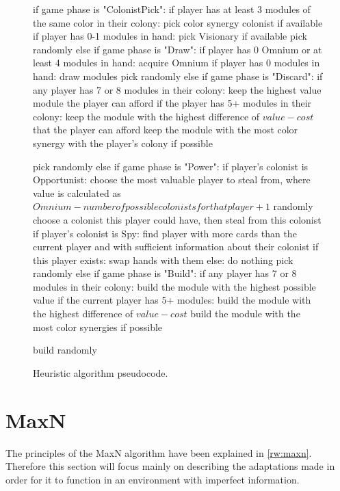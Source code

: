 \begin{figure}[h!]
\begin{code}[commandchars=\\\{\},codes={\catcode`\$=3\catcode`\^=7\catcode`\_=8}]
if game phase is "ColonistPick":
    if player has at least 3 modules of the same color in their colony:
        pick color synergy colonist if available
    if player has 0-1 modules in hand:
        pick Visionary if available
    pick randomly
else if game phase is "Draw":
    if player has 0 Omnium or at least 4 modules in hand:
        acquire Omnium
    if player has 0 modules in hand:
        draw modules
    pick randomly
else if game phase is "Discard":
    if any player has 7 or 8 modules in their colony:
        keep the highest value module the player can afford
    if the player has 5+ modules in their colony:
        keep the module with the highest difference of $value - cost$
        that the player can afford
    keep the module with the most color synergy with the player's
    colony if possible

    pick randomly
else if game phase is "Power":
    if player's colonist is Opportunist:
        choose the most valuable player to steal from,
        where value is calculated as
        $Omnium - number of possible colonists for that player + 1$
        randomly choose a colonist this player could have,
        then steal from this colonist
    if player's colonist is Spy:
        find player with more cards than the current player
        and with sufficient information about their colonist
        if this player exists:
            swap hands with them
        else:
            do nothing
    pick randomly
else if game phase is "Build":
    if any player has 7 or 8 modules in their colony:
        build the module with the highest possible value
    if the current player has 5+ modules:
        build the module with the highest difference of $value - cost$
    build the module with the most color synergies if possible

    build randomly
\end{code}
\caption{Heuristic algorithm pseudocode.}\label{algo:heur}
\end{figure}

\clearpage
\section{MaxN}
\label{sec:algomaxn}

The principles of the MaxN algorithm have been explained in \autoref{rw:maxn}. Therefore
this section will focus mainly on describing the adaptations made in order for it
to function in an environment with imperfect information.

